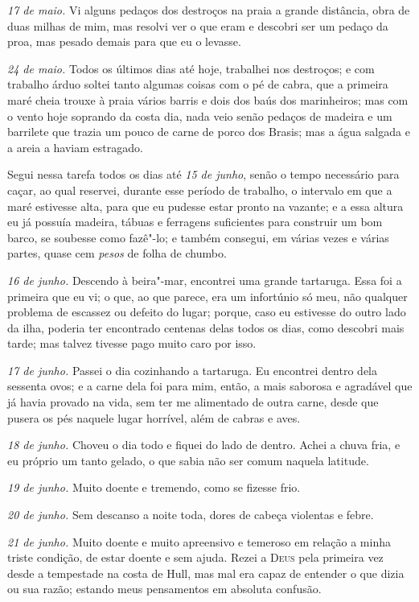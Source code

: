 \emph{17 de maio.} Vi alguns pedaços dos destroços na praia a grande
distância, obra de duas milhas de mim, mas resolvi ver o que eram e
descobri ser um pedaço da proa, mas pesado demais para que eu o levasse.

\emph{24 de maio.} Todos os últimos dias até hoje, trabalhei nos
destroços; e com trabalho árduo soltei tanto algumas coisas com o pé de
cabra, que a primeira maré cheia trouxe à praia vários barris e dois dos
baús dos marinheiros; mas com o vento hoje soprando da costa dia, nada
veio senão pedaços de madeira e um barrilete que trazia um pouco de
carne de porco dos Brasis; mas a água salgada e a areia a haviam
estragado.

Segui nessa tarefa todos os dias até \emph{15 de junho}, senão o tempo
necessário para caçar, ao qual reservei, durante esse período de
trabalho, o intervalo em que a maré estivesse alta, para que eu pudesse
estar pronto na vazante; e a essa altura eu já possuía madeira, tábuas e
ferragens suficientes para construir um bom barco, se soubesse como
fazê"-lo; e também consegui, em várias vezes e várias partes, quase cem
\emph{pesos} de folha de chumbo.

\emph{16 de junho.} Descendo à beira"-mar, encontrei uma grande
tartaruga. Essa foi a primeira que eu vi; o que, ao que parece, era um
infortúnio só meu, não qualquer problema de escassez ou defeito do
lugar; porque, caso eu estivesse do outro lado da ilha, poderia ter
encontrado centenas delas todos os dias, como descobri mais tarde; mas
talvez tivesse pago muito caro por isso.

\emph{17 de junho.} Passei o dia cozinhando a tartaruga. Eu encontrei
dentro dela sessenta ovos; e a carne dela foi para mim, então, a mais
saborosa e agradável que já havia provado na vida, sem ter me alimentado
de outra carne, desde que pusera os pés naquele lugar horrível, além de
cabras e aves.

\emph{18 de junho.} Choveu o dia todo e fiquei do lado de dentro. Achei
a chuva fria, e eu próprio um tanto gelado, o que sabia não ser comum
naquela latitude.

\emph{19 de junho.} Muito doente e tremendo, como se fizesse frio.

\emph{20 de junho.} Sem descanso a noite toda, dores de cabeça violentas
e febre.

\emph{21 de junho.} Muito doente e muito apreensivo e temeroso em
relação a minha triste condição, de estar doente e sem ajuda. Rezei a
\textsc{Deus} pela primeira vez desde a tempestade na costa de Hull, mas
mal era capaz de entender o que dizia ou sua razão; estando meus
pensamentos em absoluta confusão.

